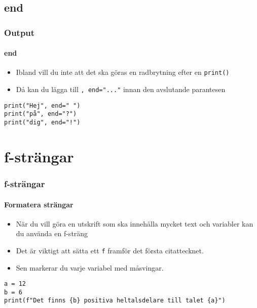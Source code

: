 \documentclass[aspectratio=169]{beamer}
\begin{document}
\subsection{end}

\begin{frame}[fragile]
	\frametitle{Output}
	\framesubtitle{end}
	
	\begin{itemize}
		\item Ibland vill du inte att det ska göras en radbrytning efter en \lstinline{print()}
		\item Då kan du lägga till \lstinline{, end="..."} innan den avslutande parantesen
	\end{itemize}
	
	\begin{lstlisting}
print("Hej", end=" ")
print("på", end="?")
print("dig", end="!")
	\end{lstlisting}
	
\end{frame}

\section{f-strängar}

\begin{frame}[fragile]
	\frametitle{f-strängar}
	\framesubtitle{Formatera strängar}
	
	\begin{itemize}
		\item När du vill göra en utskrift som ska innehålla mycket text och variabler kan du använda en f-sträng
		\item Det är viktigt att sätta ett \lstinline{f} framför det första citattecknet.
		\item Sen markerar du varje variabel med måsvingar.
	\end{itemize}	
	
	\begin{lstlisting}
a = 12
b = 6
print(f"Det finns {b} positiva heltalsdelare till talet {a}")
	\end{lstlisting}
	
\end{frame}
\end{document}
